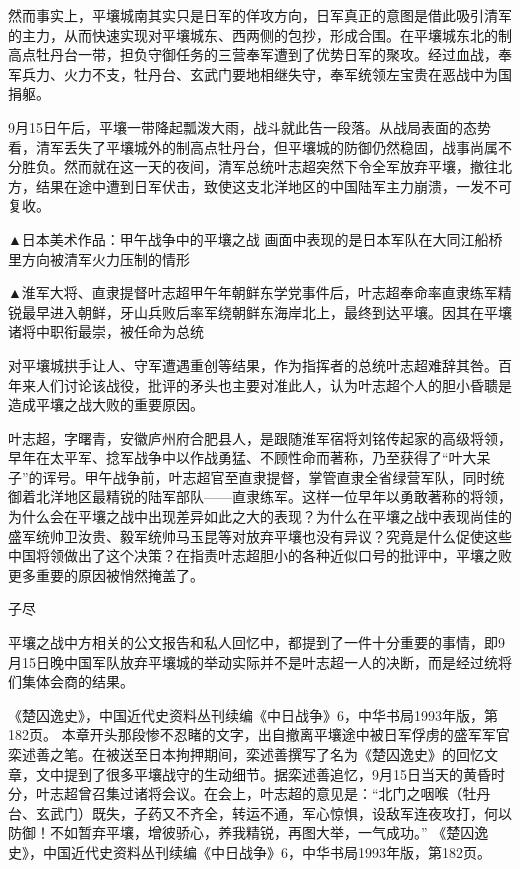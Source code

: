 \documentclass[12pt,UTF8]{ctexbook}
\begin{document}
然而事实上，平壤城南其实只是日军的佯攻方向，日军真正的意图是借此吸引清军的主力，从而快速实现对平壤城东、西两侧的包抄，形成合围。在平壤城东北的制高点牡丹台一带，担负守御任务的三营奉军遭到了优势日军的聚攻。经过血战，奉军兵力、火力不支，牡丹台、玄武门要地相继失守，奉军统领左宝贵在恶战中为国捐躯。

9月15日午后，平壤一带降起瓢泼大雨，战斗就此告一段落。从战局表面的态势看，清军丢失了平壤城外的制高点牡丹台，但平壤城的防御仍然稳固，战事尚属不分胜负。然而就在这一天的夜间，清军总统叶志超突然下令全军放弃平壤，撤往北方，结果在途中遭到日军伏击，致使这支北洋地区的中国陆军主力崩溃，一发不可复收。


▲日本美术作品：甲午战争中的平壤之战 画面中表现的是日本军队在大同江船桥里方向被清军火力压制的情形


▲淮军大将、直隶提督叶志超甲午年朝鲜东学党事件后，叶志超奉命率直隶练军精锐最早进入朝鲜，牙山兵败后率军绕朝鲜东海岸北上，最终到达平壤。因其在平壤诸将中职衔最崇，被任命为总统

对平壤城拱手让人、守军遭遇重创等结果，作为指挥者的总统叶志超难辞其咎。百年来人们讨论该战役，批评的矛头也主要对准此人，认为叶志超个人的胆小昏聩是造成平壤之战大败的重要原因。

叶志超，字曙青，安徽庐州府合肥县人，是跟随淮军宿将刘铭传起家的高级将领，早年在太平军、捻军战争中以作战勇猛、不顾性命而著称，乃至获得了“叶大呆子”的诨号。甲午战争前，叶志超官至直隶提督，掌管直隶全省绿营军队，同时统御着北洋地区最精锐的陆军部队——直隶练军。这样一位早年以勇敢著称的将领，为什么会在平壤之战中出现差异如此之大的表现？为什么在平壤之战中表现尚佳的盛军统帅卫汝贵、毅军统帅马玉昆等对放弃平壤也没有异议？究竟是什么促使这些中国将领做出了这个决策？在指责叶志超胆小的各种近似口号的批评中，平壤之败更多重要的原因被悄然掩盖了。

子尽

平壤之战中方相关的公文报告和私人回忆中，都提到了一件十分重要的事情，即9月15日晚中国军队放弃平壤城的举动实际并不是叶志超一人的决断，而是经过统将们集体会商的结果。

《楚囚逸史》，中国近代史资料丛刊续编《中日战争》6，中华书局1993年版，第182页。
本章开头那段惨不忍睹的文字，出自撤离平壤途中被日军俘虏的盛军军官栾述善之笔。在被送至日本拘押期间，栾述善撰写了名为《楚囚逸史》的回忆文章，文中提到了很多平壤战守的生动细节。据栾述善追忆，9月15日当天的黄昏时分，叶志超曾召集过诸将会议。在会上，叶志超的意见是：“北门之咽喉（牡丹台、玄武门）既失，子药又不齐全，转运不通，军心惊惧，设敌军连夜攻打，何以防御！不如暂弃平壤，增彼骄心，养我精锐，再图大举，一气成功。” 《楚囚逸史》，中国近代史资料丛刊续编《中日战争》6，中华书局1993年版，第182页。
\end{document}
